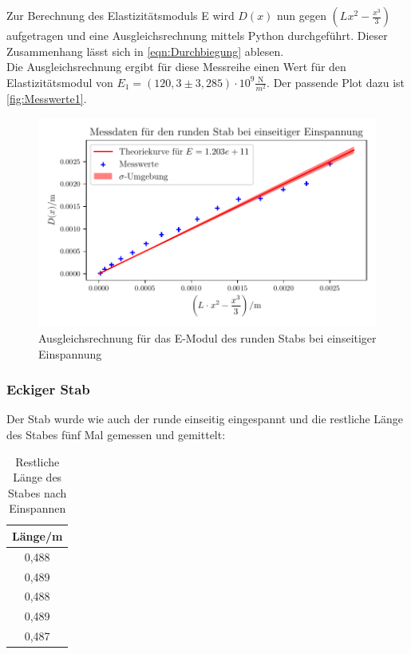   Zur Berechnung des Elastizitätsmoduls E wird $D(x)$ nun gegen $\left(Lx^2-\frac{x^3}{3}\right)$ aufgetragen und eine Ausgleichsrechnung mittels Python durchgeführt. Dieser
  Zusammenhang lässt sich in \autoref{eqn:Durchbiegung} ablesen.\\
  Die Ausgleichsrechnung ergibt für diese Messreihe einen Wert für den Elastizitätsmodul von $E_1 = (120{,}3 \pm 3{,}285) \cdot \mathrm{10^{9}} \frac{\mathrm{N}}{m^2}$. Der passende Plot dazu ist
  \autoref{fig:Messwerte1}.

  \begin{figure}
    \centering
    \includegraphics{build/plot2.pdf}
    \caption{Ausgleichsrechnung für das E-Modul des runden Stabs bei einseitiger Einspannung}
    \label{fig:Messwerte1}
  \end{figure}

  \newpage

\subsubsection{Eckiger Stab}
  Der Stab wurde wie auch der runde einseitig eingespannt und die restliche Länge des Stabes fünf Mal gemessen und gemittelt:

  \begin{table}
    \centering
    \caption{Restliche Länge des Stabes nach Einspannen}
    \label{tab:einseitig_eckiger_Laenge}
    \begin{tabular}{c}
      \toprule
      Länge/m \\
      \midrule
      0,488 \\
      0,489 \\
      0,488 \\
      0,489 \\
      0,487 \\
      \bottomrule
    \end{tabular}
  \end{table}

